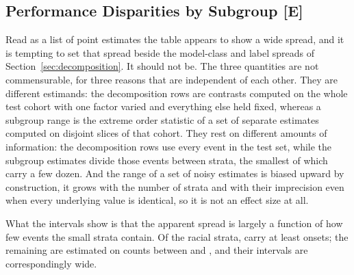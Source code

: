 \subsection{Performance Disparities by Subgroup \texorpdfstring{[E]}{[E]}}

\begin{table}[H]
    \centering\footnotesize
    \caption{AUROC by racial stratum (Variant B, temporal test) with 95\%
    stay-level cluster-bootstrap intervals, stratified within stratum,
    $B = 2{,}000$. Levels are ordered by exposure; interval width grows by
    roughly an order of magnitude from the largest stratum to the smallest.
    Strata carrying fewer than \pcMinSubgroupEvents{} sepsis onsets are marked
    $\dagger$: they are shown so that the composition of the cohort is visible,
    and are neither interpreted nor entered into family E1
    (Section~\ref{sec:equity_strata}). \textbf{[E] exploratory.}}
    \label{tab:equity_performance}
\end{table}

Read as a list of point estimates the table appears to show a wide spread, and
it is tempting to set that spread beside the model-class and label spreads of
Section~\ref{sec:decomposition}. It should not be. The three quantities are not
commensurable, for three reasons that are independent of each other. They are
different estimands: the decomposition rows are contrasts computed on the whole
test cohort with one factor varied and everything else held fixed, whereas a
subgroup range is the extreme order statistic of a set of separate estimates
computed on disjoint slices of that cohort. They rest on different amounts of
information: the decomposition rows use every event in the test set, while the
subgroup estimates divide those events between strata, the smallest of which
carry a few dozen. And the range of a set of noisy estimates is biased upward
by construction, it grows with the number of strata and with their
imprecision even when every underlying value is identical, so it is not an
effect size at all.

What the intervals show is that the apparent spread is largely a function of
how few events the small strata contain. Of the racial strata,
\pcNSubgroupsAboveFloor{} carry at least \pcMinSubgroupEvents{} onsets; the
remaining \pcEquityRaceBelowFloorN{} are estimated on counts between
\pcEquityRaceBelowFloorMin{} and \pcEquityRaceBelowFloorMax, and their
intervals are correspondingly wide.

